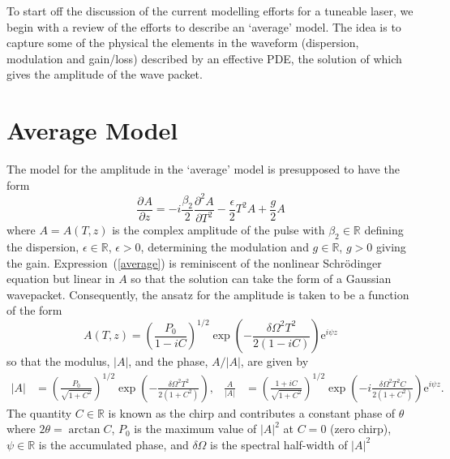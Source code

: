 \documentclass[12pt]{article}
\title{}
\author{Brady Metherall \& C.\ Sean Bohun}
\newcommand{\pdiff}[3][]{\frac{\partial^{#1}#2}{\partial{#3}^{#1}}}
\begin{document}
\maketitle


\noindent
To start off the discussion of the current modelling efforts for a tuneable laser, we begin with a review 
of the efforts to describe an `average' model.  The idea is to capture some of the physical the elements 
in the waveform (dispersion, modulation and gain/loss) described by an effective PDE, the solution of
which gives the amplitude of the wave packet.

\section{Average Model}

The model for the amplitude in the `average' model is presupposed to have the form
\begin{equation}
\label{average}
	\pdiff{A}{z} = -i\frac{\beta_2}{2}\pdiff[2]{A}{T} - \frac{\epsilon}{2}T^2 A + \frac{g}{2}A
\end{equation}
where $A=A(T,z)$ is the complex amplitude of the pulse
with $\beta_2 \in \mathbb{R}$ defining the dispersion, $\epsilon \in \mathbb{R}$, $\epsilon > 0$, determining the
modulation and $g \in \mathbb{R}$, $g > 0$ giving the gain.  Expression~(\ref{average}) is reminiscent of the 
nonlinear Schr\"odinger equation but linear in $A$ so that the solution can take the form of a Gaussian wavepacket.
Consequently, the ansatz for the amplitude is taken to be a function of the form
\begin{equation}
\label{ansatz}
	A(T,z) = \left(\frac{P_0}{1-i C}\right)^{1/2}\exp
	\left(-\frac{\delta \Omega^2 T^2}{2(1-i C)}\right)\textrm{e}^{i\psi z}
\end{equation}
so that the modulus, $|A|$, and the phase, $A/|A|$, are given by
\begin{align*}
	\left|A\right| &= \left(\frac{P_0}{\sqrt{1 + C^2}}\right)^{1/2}
	\exp\left(-\frac{\delta \Omega^2 T^2}{2(1 + C^2)}\right),&
	\frac{A}{|A|} &= \left(\frac{1+iC}{\sqrt{1+C^2}}\right)^{1/2}\exp
	\left(-i\frac{\delta \Omega^2 T^2 C}{2(1+C^2)}\right)\textrm{e}^{i\psi z}.
\end{align*}
The quantity $C \in \mathbb{R}$ is known as the chirp and contributes a constant phase of $\theta$ where
$2\theta = \arctan C$, $P_0$ is the maximum value of $|A|^2$ at $C=0$ (zero chirp), $\psi \in \mathbb{R}$
is the accumulated phase, and $\delta\Omega$ is the spectral half-width of $|A|^2$ 
\end{document}
